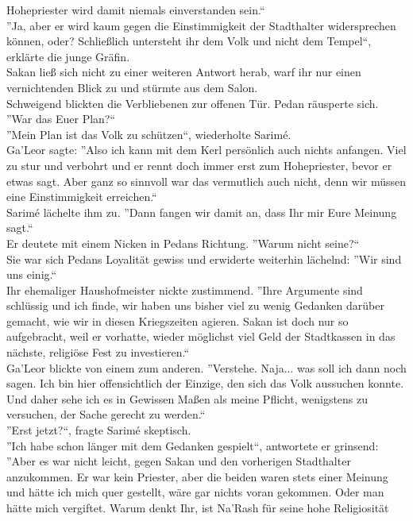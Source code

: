 Hohepriester wird damit niemals einverstanden sein.``\\
''Ja, aber er wird kaum gegen die Einstimmigkeit der Stadthalter widersprechen können, oder? 
Schließlich untersteht ihr dem Volk und nicht dem Tempel``, erklärte die junge Gräfin.\\
Sakan ließ sich nicht zu einer weiteren Antwort herab, warf ihr nur einen vernichtenden Blick zu 
und stürmte aus dem Salon.\\
Schweigend blickten die Verbliebenen zur offenen Tür. Pedan räusperte sich. ''War das Euer Plan?``\\
''Mein Plan ist das Volk zu schützen``, wiederholte Sarimé.\\
Ga'Leor sagte: ''Also ich kann mit dem Kerl persönlich auch nichts anfangen. Viel zu stur und 
verbohrt und er rennt doch immer erst zum Hohepriester, bevor er etwas sagt. Aber ganz so sinnvoll 
war das vermutlich auch nicht, denn wir müssen eine Einstimmigkeit erreichen.``\\
Sarimé lächelte ihm zu. ''Dann fangen wir damit an, dass Ihr mir Eure Meinung sagt.``\\
Er deutete mit einem Nicken in Pedans Richtung. ''Warum nicht seine?``\\
Sie war sich Pedans Loyalität gewiss und erwiderte weiterhin lächelnd: ''Wir sind uns einig.``\\
Ihr ehemaliger Haushofmeister nickte zustimmend. ''Ihre Argumente sind schlüssig und ich finde, wir 
haben uns bisher viel zu wenig Gedanken darüber gemacht, wie wir in diesen Kriegszeiten agieren. 
Sakan ist doch nur so aufgebracht, weil er vorhatte, wieder möglichst viel Geld der Stadtkassen in 
das nächste, religiöse Fest zu investieren.``\\
Ga'Leor blickte von einem zum anderen. ''Verstehe. Naja... was soll ich dann noch sagen. Ich bin 
hier offensichtlich der Einzige, den sich das Volk aussuchen konnte. Und daher sehe ich es in 
Gewissen Maßen als meine Pflicht, wenigstens zu versuchen, der Sache gerecht zu werden.``\\
''Erst jetzt?``, fragte Sarimé skeptisch.\\
''Ich habe schon länger mit dem Gedanken gespielt``, antwortete er grinsend: ''Aber es war nicht 
leicht, gegen Sakan und den vorherigen Stadthalter anzukommen. Er war kein Priester, aber die 
beiden waren stets einer Meinung und hätte ich mich quer gestellt, wäre gar nichts voran gekommen. 
Oder man hätte mich vergiftet. Warum denkt Ihr, ist Na'Rash für seine hohe Religiosität 
